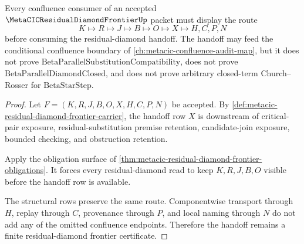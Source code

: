 \begin{theorem}
\label{thm:metacic-residual-diamond-frontier-confluence-handoff}
Every confluence consumer of an accepted $\MetaCICResidualDiamondFrontierUp$ packet must display the route
$$
K \longmapsto R \longmapsto J \longmapsto B \longmapsto O \longmapsto X \longmapsto H,C,P,N
$$
before consuming the residual-diamond handoff. The handoff may feed the conditional confluence boundary of \autoref{ch:metacic-confluence-audit-map}, but it does not prove $\mathrm{BetaParallelSubstitutionCompatibility}$, does not prove $\mathrm{BetaParallelDiamondClosed}$, and does not prove arbitrary closed-term Church--Rosser for $\mathrm{BetaStarStep}$.
\end{theorem}
\begin{proof}
Let $F=(K,R,J,B,O,X,H,C,P,N)$ be accepted. By \autoref{def:metacic-residual-diamond-frontier-carrier}, the handoff row $X$ is downstream of critical-pair exposure, residual-substitution premise retention, candidate-join exposure, bounded checking, and obstruction retention.

Apply the obligation surface of \autoref{thm:metacic-residual-diamond-frontier-obligations}. It forces every residual-diamond read to keep $K,R,J,B,O$ visible before the handoff row is available.

The structural rows preserve the same route. Componentwise transport through $H$, replay through $C$, provenance through $P$, and local naming through $N$ do not add any of the omitted confluence endpoints. Therefore the handoff remains a finite residual-diamond frontier certificate.
\end{proof}

\begin{closurestatus}{\MetaCICResidualDiamondFrontierUp}
  \theoryclosure{\seedClosure}
  \formalstatus{\unformalizedV}
\end{closurestatus}
